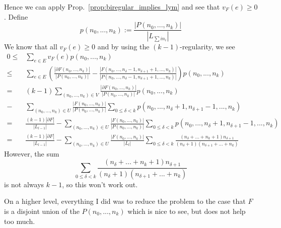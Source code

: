 \documentclass{scrartcl}
\theoremstyle{definition}
\begin{document}
Hence we can apply Prop.~\ref{prop:biregular_implies_lym} and see that $v_F(e) \geq 0$.
Define
\begin{equation*}
    p(n_0, ..., n_k) := \frac {|P(n_0, ..., n_k)|} {|L_{\sum in_i}|}
\end{equation*}
We know that all $v_F(e) \geq 0$ and by using the $(k - 1)$-regularity, we see
\begin{align*}
    0 \leq &\sum_{e \in E} v_F(e) p(n_0, ..., n_k) \\
    \leq &\sum_{e \in E} \left( \frac {|\partial F(n_0, ..., n_k)|} {|P(n_0, ..., n_k)|} - \frac {|F(n_0, ..., n_\delta - 1, n_{\delta + 1} + 1, ..., n_k)|} {|P(n_0, ..., n_\delta - 1, n_{\delta + 1} + 1, ..., n_k)|} \right) p(n_0, ..., n_k) \\
    = &(k - 1)\sum_{(n_0, ..., n_k) \in V} \frac {|\partial F(n_0, ..., n_k)|} {|P(n_0, ..., n_k)|} p(n_0, ..., n_k) \\
    - &\sum_{(n_0, ..., n_k) \in U} \frac {|F(n_0, ..., n_k)|} {|P(n_0, ..., n_k)|} \sum_{0 \leq \delta < k} p(n_0, ..., n_\delta + 1, n_{\delta + 1} - 1, ..., n_k) \\
    = &\frac {(k - 1) |\partial F|} {|L_{l - 1}|} - \sum_{(n_0, ..., n_k) \in U} \frac {|F(n_0, ..., n_k)|} {|P(n_0, ..., n_k)|} \sum_{0 \leq \delta < k} p(n_0, ..., n_\delta + 1, n_{\delta + 1} - 1, ..., n_k) \\
    = &\frac {(k - 1) |\partial F|} {|L_{l - 1}|} - \sum_{(n_0, ..., n_k) \in U} \frac {|F(n_0, ..., n_k)|} {|L_l|} \sum_{0 \leq \delta < k} \frac {(n_\delta + ... + n_k + 1)n_{\delta + 1}} {(n_\delta + 1)(n_{\delta + 1} + ... + n_k)}
\end{align*}
However, the sum
\begin{equation*}
    \sum_{0 \leq \delta < k} \frac {(n_\delta + ... + n_k + 1)n_{\delta + 1}} {(n_\delta + 1)(n_{\delta + 1} + ... + n_k)}
\end{equation*}
is not always $k - 1$, so this won't work out.

On a higher level, everything I did was to reduce the problem to the case that $F$ is a disjoint union of the $P(n_0, ..., n_k)$ which is nice to see, but does not help too much.
\end{document}
